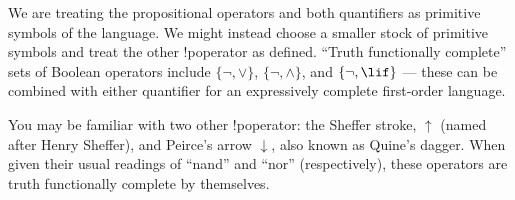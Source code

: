 \documentclass[../../include/open-logic-section]{subfiles}
\begin{document}
\begin{explain}
We are treating the propositional operators and both quantifiers as
primitive symbols of the language. We might instead choose a smaller
stock of primitive symbols and treat the other !p{operator} as
defined. ``Truth functionally complete'' sets of Boolean operators
include $\{ \lnot, \lor \}$, $\{ \lnot, \land \}$, and $\{ \lnot,
\lif\}$ --- these can be combined with either quantifier for an
expressively complete first-order language.

You may be familiar with two other !p{operator}: the Sheffer
stroke, $\uparrow$ (named after Henry Sheffer), and Peirce's arrow
$\downarrow$, also known as Quine's dagger. When given their usual
readings of ``nand'' and ``nor'' (respectively), these operators are
truth functionally complete by themselves.
\end{explain}
\end{document}
